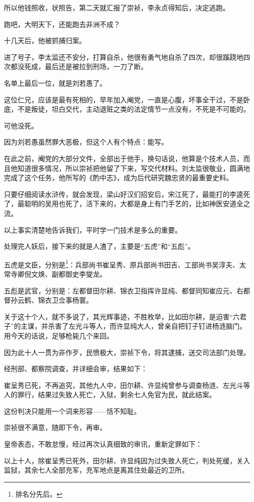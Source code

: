 \begin{multicols}{\theparacolNo}
所以他钱照收，状照告，第二天就汇报了崇祯，李永贞得知后，决定逃跑。

跑吧，大明天下，还能跑去非洲不成？

十几天后，他被抓捕归案。

进了号子，李太监还不安分，打算自杀，他很有勇气地自杀了四次，却很蹊跷地四次都没死成，最后还是被拉到刑场，一刀了断。

名单上最后一位，就是刘若愚了。

这位仁兄，应该是最有死相的，早年加入阉党，一直是心腹，坏事全干过，不是卧底，不是叛徒，坦白交代，主动退赃之类的法定情节一点没有，不死是不可能的。

可他没死。

因为刘若愚虽然罪大恶极，但这个人有个特点：能写。

在此之前，阉党的大部分文件，全部出于他手，换句话说，他算是个技术人员，而且他知道很多情况，所以崇祯把他留了下来，写交代材料。刘太监很敬业，圆满地完成了这个任务，他所写的《酌中志》，成为后代研究魏忠贤的最重要史料。

只要仔细阅读水浒传，就会发现，梁山好汉们招安后，宋江死了，最能打的李逵死了，最聪明的吴用也死了，活下来的，大都是身上有门手艺的，比如神医安道全之流。

以上事实清楚地告诉我们，平时学一门技术是多么的重要。

处理完人妖后，接下来的就是人渣了，主要是“五虎”和“五彪”。

五虎是文臣，分别是\footnote{排名分先后。}：兵部尚书崔呈秀、原兵部尚书田吉、工部尚书吴淳夫、太常寺卿倪文焕、副都御史李燮龙。

五彪是武官，分别是：左都督田尔耕、锦衣卫指挥许显纯、都督同知崔应元、右都督孙云鹤、锦衣卫佥事杨寰。

关于这十个人，就不多说了，其光辉事迹，不胜枚举，比如田尔耕，是迫害“六君子”的主谋，并杀害了左光斗等人，而许显纯大人，曾亲自把钉子钉进杨涟脑门。用今天的话说，足够枪毙几个来回。

因为此十人一贯为非作歹，民愤极大，崇祯下令，将其逮捕，送交司法部门处理。

经刑部、都察院调查，并详细会审，结果如下：

崔呈秀已死，不再追究，其他九人中，田尔耕、许显纯曾参与调查杨涟、左光斗等人的罪行，结果过失致人死亡，入狱，剩余七人免官为民，就此结案。

这份判决只能用一个词来形容——恬不知耻。

崇祯很不满意，随即下令，再审。

皇帝表态，不敢怠慢，经过再次认真细致的审讯，重新定罪如下：

以上十人，除崔呈秀已死外，田尔耕、许显纯因为过失致人死亡，判处死缓，关入监狱，其余七人全部充军，充军地点是离其住处最近的卫所。


\end{multicols}

